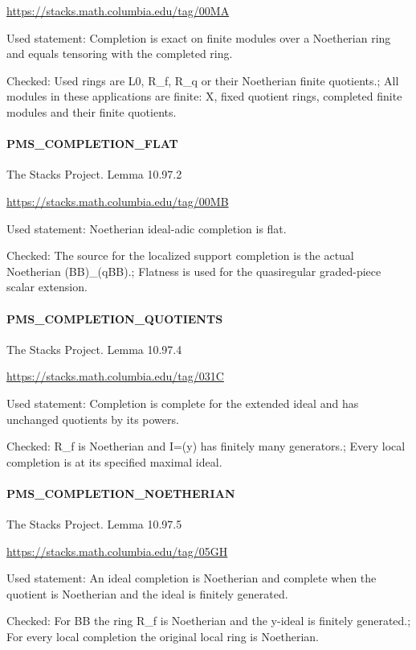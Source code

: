 \url{https://stacks.math.columbia.edu/tag/00MA}

Used statement: Completion is exact on finite modules over a Noetherian ring and equals tensoring with the completed ring.

Checked: Used rings are L0, R\_\allowbreak{}f, R\_\allowbreak{}q or their Noetherian finite quotients.; All modules in these applications are finite: X, fixed quotient rings, completed finite modules and their finite quotients.

\paragraph{PMS\_\allowbreak{}COMPLETION\_\allowbreak{}FLAT}The Stacks Project. Lemma 10.97.2

\url{https://stacks.math.columbia.edu/tag/00MB}

Used statement: Noetherian ideal-adic completion is flat.

Checked: The source for the localized support completion is the actual Noetherian (BB)\_\allowbreak{}(qBB).; Flatness is used for the quasiregular graded-piece scalar extension.

\paragraph{PMS\_\allowbreak{}COMPLETION\_\allowbreak{}QUOTIENTS}The Stacks Project. Lemma 10.97.4

\url{https://stacks.math.columbia.edu/tag/031C}

Used statement: Completion is complete for the extended ideal and has unchanged quotients by its powers.

Checked: R\_\allowbreak{}f is Noetherian and I=(y) has finitely many generators.; Every local completion is at its specified maximal ideal.

\paragraph{PMS\_\allowbreak{}COMPLETION\_\allowbreak{}NOETHERIAN}The Stacks Project. Lemma 10.97.5

\url{https://stacks.math.columbia.edu/tag/05GH}

Used statement: An ideal completion is Noetherian and complete when the quotient is Noetherian and the ideal is finitely generated.

Checked: For BB the ring R\_\allowbreak{}f is Noetherian and the y-ideal is finitely generated.; For every local completion the original local ring is Noetherian.

